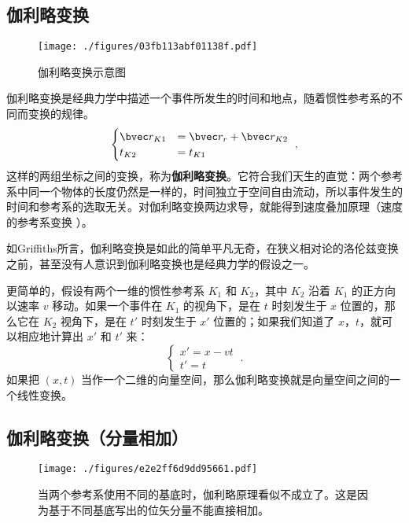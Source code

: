 

\subsection{伽利略变换}
\begin{figure}[ht]
\centering
\texttt{[image: ./figures/03fb113abf01138f.pdf]}
\caption{伽利略变换示意图} \label{fig_GaliTr_1}
\end{figure}

伽利略变换是经典力学中描述一个事件所发生的时间和地点，随着惯性参考系的不同而变换的规律。
\begin{equation}
\begin{cases}
\bvec r_{K1} &= \bvec r_{r}+\bvec r_{K2}\\
t_{K2}&=t_{K1}
\end{cases}~,
\end{equation}
这样的两组坐标之间的变换，称为\textbf{伽利略变换}。它符合我们天生的直觉：两个参考系中同一个物体的长度仍然是一样的，时间独立于空间自由流动，所以事件发生的时间和参考系的选取无关。对伽利略变换两边求导，就能得到速度叠加原理（速度的参考系变换 ）。

如Griffiths所言，伽利略变换是如此的简单平凡无奇，在狭义相对论的洛伦兹变换之前，甚至没有人意识到伽利略变换也是经典力学的假设之一。

更简单的，假设有两个一维的惯性参考系 $K_1$ 和 $K_2$，其中 $K_2$ 沿着 $K_1$ 的正方向以速率 $v$ 移动。如果一个事件在 $K_1$ 的视角下，是在 $t$ 时刻发生于 $x$ 位置的，那么它在 $K_2$ 视角下，是在 $t'$ 时刻发生于 $x'$ 位置的；如果我们知道了 $x$，$t$，就可以相应地计算出 $x'$ 和 $t'$ 来：
\begin{equation}
\begin{cases}
x' = x - vt\\
t' = t
\end{cases}~.
\end{equation}
如果把 $(x, t)$ 当作一个二维的向量空间，那么伽利略变换就是向量空间之间的一个线性变换。

\subsection{伽利略变换（分量相加）}
\begin{figure}[ht]
\centering
\texttt{[image: ./figures/e2e2ff6d9dd95661.pdf]}
\caption{当两个参考系使用不同的基底时，伽利略原理看似不成立了。这是因为基于不同基底写出的位矢分量不能直接相加。} \label{fig_GaliTr_2}
\end{figure}

